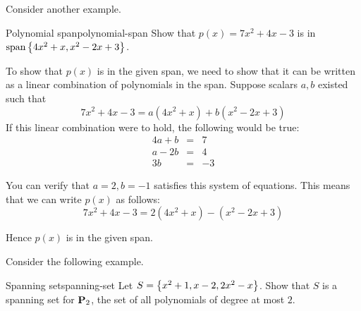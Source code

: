 Consider another example.

\begin{example}{Polynomial span}{polynomial-span}
Show that $p(x) = 7x^2 + 4x - 3$ is in $\sspan\set{4x^2 + x, x^2 -2x + 3 }$.
\end{example}

\begin{solution}
To show that $p(x)$ is in the given span, we need to show that it can be written as a linear combination of polynomials in the span. Suppose scalars $a, b$ existed such that
\[
7x^2 +4x - 3= a(4x^2+x) + b (x^2-2x+3)
\]
If this linear combination were to hold, the following would be true:
\begin{eqnarray*}
4a + b &=& 7 \\
a - 2b &=& 4 \\
3b &=& -3
\end{eqnarray*}

You can verify that $a = 2, b = -1$ satisfies this system of equations. This means that we can write $p(x)$ as follows:
\[
 7x^2 +4x-3= 2(4x^2+x)  - (x^2-2x+3)
\]

Hence $p(x)$ is in the given span.
\end{solution}

Consider the following example.

\begin{example}{Spanning set}{spanning-set}
Let $S = \left\{x^2 + 1, x-2, 2x^2 - x \right\}$. Show that $S$ is a spanning set for $\mathbf{P}_2$, the set of all polynomials of degree at most $2$.
\end{example}


